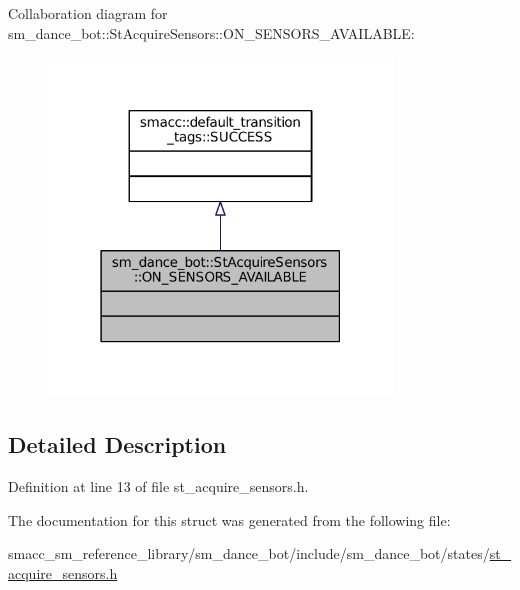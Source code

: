Collaboration diagram for sm\+\_\+dance\+\_\+bot\+:\+:St\+Acquire\+Sensors\+:\+:O\+N\+\_\+\+S\+E\+N\+S\+O\+R\+S\+\_\+\+A\+V\+A\+I\+L\+A\+B\+LE\+:
\nopagebreak
\begin{figure}[H]
\begin{center}
\leavevmode
\includegraphics[width=259pt]{structsm__dance__bot_1_1StAcquireSensors_1_1ON__SENSORS__AVAILABLE__coll__graph}
\end{center}
\end{figure}


\subsection{Detailed Description}


Definition at line 13 of file st\+\_\+acquire\+\_\+sensors.\+h.



The documentation for this struct was generated from the following file\+:\begin{DoxyCompactItemize}
\item 
smacc\+\_\+sm\+\_\+reference\+\_\+library/sm\+\_\+dance\+\_\+bot/include/sm\+\_\+dance\+\_\+bot/states/\hyperlink{include_2sm__dance__bot_2states_2st__acquire__sensors_8h}{st\+\_\+acquire\+\_\+sensors.\+h}\end{DoxyCompactItemize}
